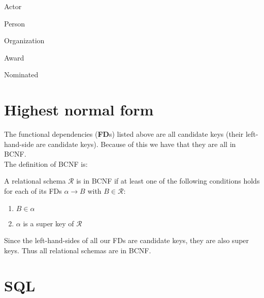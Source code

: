 {\begin{dependencies}{Actor}
\end{dependencies}

\begin{dependencies}{Person}
\end{dependencies}

\begin{dependencies}{Organization}
\end{dependencies}

\begin{dependencies}{Award}
\end{dependencies}

\begin{dependencies}{Nominated}
\end{dependencies}
}
\section{Highest normal form}
The functional dependencies (\textbf{FD}s) listed above are all candidate keys (their left-hand-side are candidate keys).
Because of this we have that they are all in BCNF.\\
The definition of BCNF is:
\begin{definition}
A relational schema $\mathcal{R}$ is in BCNF if at least one of the following conditions holds for each of its FDs $\alpha \rightarrow B$ with $B \in \mathcal{R}$:
\begin{enumerate}
\item $B \in \alpha$
\item $\alpha$ is a super key of $\mathcal{R}$
\end{enumerate}
\end{definition}
Since the left-hand-sides of all our FDs are candidate keys, they are also super keys.
Thus all relational schemas are in BCNF.

\section{SQL}

\newcommand{\attribute}[4][,]{#2 & \textbf{#3} \uppercase{#4}#1\\}
\newcommand{\primarykey}[1]{\multicolumn{2}{l}{PRIMARY KEY(#1)}\\}
\newcommand{\foreignkey}[2]{\multicolumn{2}{l}{FOREIGN KEY(#1)} REFERENCES #2\\}

